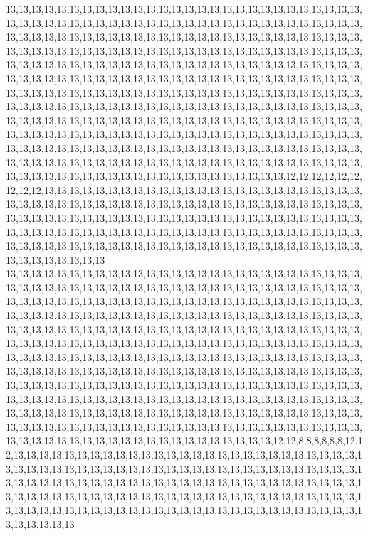 13,13,13,13,13,13,13,13,13,13,13,13,13,13,13,13,13,13,13,13,13,13,13,13,13,13,13,13,13,13,13,13,13,13,13,13,13,13,13,13,13,13,13,13,13,13,13,13,13,13,13,13,13,13,13,13,13,13,13,13,13,13,13,13,13,13,13,13,13,13,13,13,13,13,13,13,13,13,13,13,13,13,13,13,13,13,13,13,13,13,13,13,13,13,13,13,13,13,13,13,13,13,13,13,13,13,13,13,13,13,13,13,13,13,13,13,13,13,13,13,13,13,13,13,13,13,13,13,13,13,13,13,13,13,13,13,13,13,13,13,13,13,13,13,13,13,13,13,13,13,13,13,13,13,13,13,13,13,13,13,13,13,13,13,13,13,13,13,13,13,13,13,13,13,13,13,13,13,13,13,13,13,13,13,13,13,13,13,13,13,13,13,13,13,13,13,13,13,13,13,13,13,13,13,13,13,13,13,13,13,13,13,13,13,13,13,13,13,13,13,13,13,13,13,13,13,13,13,13,13,13,13,13,13,13,13,13,13,13,13,13,13,13,13,13,13,13,13,13,13,13,13,13,13,13,13,13,13,13,13,13,13,13,13,13,13,13,13,13,13,13,13,13,13,13,13,13,13,13,13,13,13,13,13,13,13,13,13,13,13,13,13,13,13,13,13,13,13,13,13,13,13,13,13,13,13,13,13,13,13,13,13,13,13,13,13,13,13,13,13,13,13,13,13,13,13,13,13,13,13,13,13,13,13,13,13,13,13,13,13,13,13,13,13,13,13,13,13,13,13,13,13,13,13,13,13,13,13,12,12,12,12,12,12,12,12,12,13,13,13,13,13,13,13,13,13,13,13,13,13,13,13,13,13,13,13,13,13,13,13,13,13,13,13,13,13,13,13,13,13,13,13,13,13,13,13,13,13,13,13,13,13,13,13,13,13,13,13,13,13,13,13,13,13,13,13,13,13,13,13,13,13,13,13,13,13,13,13,13,13,13,13,13,13,13,13,13,13,13,13,13,13,13,13,13,13,13,13,13,13,13,13,13,13,13,13,13,13,13,13,13,13,13,13,13,13,13,13,13,13,13,13,13,13,13,13,13,13,13,13,13,13,13,13,13,13,13,13,13,13,13,13,13,13,13,13,13,13,13,13,13,13
13,13,13,13,13,13,13,13,13,13,13,13,13,13,13,13,13,13,13,13,13,13,13,13,13,13,13,13,13,13,13,13,13,13,13,13,13,13,13,13,13,13,13,13,13,13,13,13,13,13,13,13,13,13,13,13,13,13,13,13,13,13,13,13,13,13,13,13,13,13,13,13,13,13,13,13,13,13,13,13,13,13,13,13,13,13,13,13,13,13,13,13,13,13,13,13,13,13,13,13,13,13,13,13,13,13,13,13,13,13,13,13,13,13,13,13,13,13,13,13,13,13,13,13,13,13,13,13,13,13,13,13,13,13,13,13,13,13,13,13,13,13,13,13,13,13,13,13,13,13,13,13,13,13,13,13,13,13,13,13,13,13,13,13,13,13,13,13,13,13,13,13,13,13,13,13,13,13,13,13,13,13,13,13,13,13,13,13,13,13,13,13,13,13,13,13,13,13,13,13,13,13,13,13,13,13,13,13,13,13,13,13,13,13,13,13,13,13,13,13,13,13,13,13,13,13,13,13,13,13,13,13,13,13,13,13,13,13,13,13,13,13,13,13,13,13,13,13,13,13,13,13,13,13,13,13,13,13,13,13,13,13,13,13,13,13,13,13,13,13,13,13,13,13,13,13,13,13,13,13,13,13,13,13,13,13,13,13,13,13,13,13,13,13,13,13,13,13,13,13,13,13,13,13,13,13,13,13,13,13,13,13,13,13,13,13,13,13,13,13,13,13,13,13,13,13,13,13,13,13,13,13,13,13,13,13,13,13,13,13,13,13,13,13,13,13,13,13,13,13,13,13,13,13,13,13,13,12,12,8,8,8,8,8,8,12,12,13,13,13,13,13,13,13,13,13,13,13,13,13,13,13,13,13,13,13,13,13,13,13,13,13,13,13,13,13,13,13,13,13,13,13,13,13,13,13,13,13,13,13,13,13,13,13,13,13,13,13,13,13,13,13,13,13,13,13,13,13,13,13,13,13,13,13,13,13,13,13,13,13,13,13,13,13,13,13,13,13,13,13,13,13,13,13,13,13,13,13,13,13,13,13,13,13,13,13,13,13,13,13,13,13,13,13,13,13,13,13,13,13,13,13,13,13,13,13,13,13,13,13,13,13,13,13,13,13,13,13,13,13,13,13,13,13,13,13,13,13,13,13,13,13
